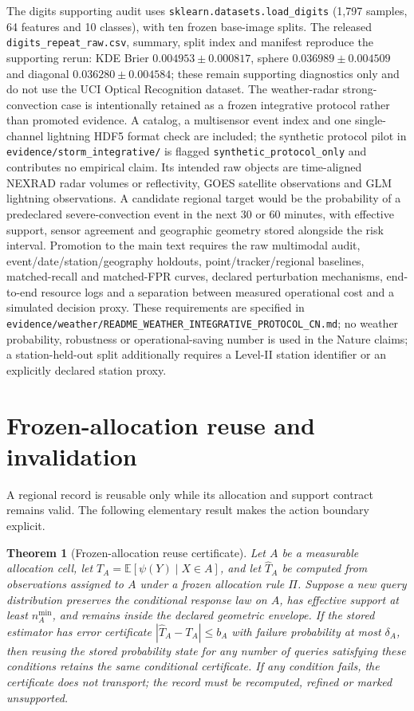 \documentclass[11pt,a4paper]{article}
\newcommand{\E}{\mathbb E}\newcommand{\Pp}{\mathbb P}
\numberwithin{equation}{section}
\newtheorem{theorem}{Theorem}[section]
\theoremstyle{definition}\newtheorem{definition}[theorem]{Definition}
\theoremstyle{remark}\newtheorem{remark}[theorem]{Remark}
\begin{document}
The digits supporting audit uses \texttt{sklearn.datasets.load\_digits} (1,797 samples, 64 features and 10 classes), with ten frozen base-image splits. The released \texttt{digits\_repeat\_raw.csv}, summary, split index and manifest reproduce the supporting rerun: KDE Brier $0.004953\pm0.000817$, sphere $0.036989\pm0.004509$ and diagonal $0.036280\pm0.004584$; these remain supporting diagnostics only and do not use the UCI Optical Recognition dataset. The weather-radar strong-convection case is intentionally retained as a frozen integrative protocol rather than promoted evidence. A catalog, a multisensor event index and one single-channel lightning HDF5 format check are included; the synthetic protocol pilot in \texttt{evidence/storm\_integrative/} is flagged \texttt{synthetic\_protocol\_only} and contributes no empirical claim. Its intended raw objects are time-aligned NEXRAD radar volumes or reflectivity, GOES satellite observations and GLM lightning observations. A candidate regional target would be the probability of a predeclared severe-convection event in the next 30 or 60 minutes, with effective support, sensor agreement and geographic geometry stored alongside the risk interval. Promotion to the main text requires the raw multimodal audit, event/date/station/geography holdouts, point/tracker/regional baselines, matched-recall and matched-FPR curves, declared perturbation mechanisms, end-to-end resource logs and a separation between measured operational cost and a simulated decision proxy. These requirements are specified in \texttt{evidence/weather/README\_WEATHER\_INTEGRATIVE\_PROTOCOL\_CN.md}; no weather probability, robustness or operational-saving number is used in the Nature claims; a station-held-out split additionally requires a Level-II station identifier or an explicitly declared station proxy.

\section{Frozen-allocation reuse and invalidation}
\label{sec:frozenreuse}
A regional record is reusable only while its allocation and support contract remains valid. The following elementary result makes the action boundary explicit.

\begin{theorem}[Frozen-allocation reuse certificate]\label{thm:frozenreuse}
Let $A$ be a measurable allocation cell, let $T_A=\E[\psi(Y)\mid X\in A]$, and let $\widehat T_A$ be computed from observations assigned to $A$ under a frozen allocation rule $\Pi$. Suppose a new query distribution preserves the conditional response law on $A$, has effective support at least $n_A^{\min}$, and remains inside the declared geometric envelope. If the stored estimator has error certificate $|\widehat T_A-T_A|\leq b_A$ with failure probability at most $\delta_A$, then reusing the stored probability state for any number of queries satisfying these conditions retains the same conditional certificate. If any condition fails, the certificate does not transport; the record must be recomputed, refined or marked unsupported.
\end{theorem}
\end{document}
